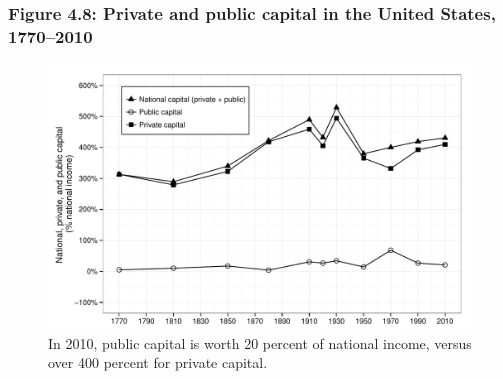 \documentclass[t]{beamer}\usepackage[]{graphicx}\usepackage[]{color}
\newenvironment{knitrout}{}{} %
\begin{document}
\begin{frame}[label=Figure_4_8]
\frametitle{Figure 4.8: Private and public capital in the United States, 1770--2010}
\begin{figure}[t]
\begin{minipage}[b]{\textwidth}
\centering
\begin{knitrout}\footnotesize
{}\color{fgcolor}

{\centering \includegraphics[width=1\linewidth]{figures/bw/Figure_4_8} 

}



\end{knitrout}
\caption{In 2010, public capital is worth 20 percent of national income, versus over 400 percent for private capital.}
\end{minipage}
\end{figure}
\end{frame}
\end{document}
